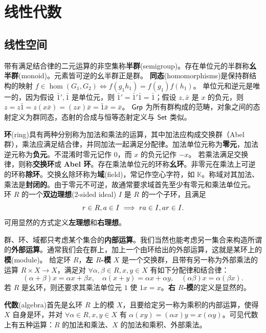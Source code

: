 \chapter{线性代数}\label{appx:LA}

\section{线性空间}\label{sec:linear-space}

带有满足结合律的二元运算的非空集称\textbf{半群}(semigroup)。存在单位元的半群称\textbf{幺半群}(monoid)。元素皆可逆的幺半群正是群。
\textbf{同态}(homomorphisms)是保持群结构的映射 $f \in \hom(G_1, G_2 ) \Leftrightarrow f (g_1 h_1 )=f (g_1 ) f (h_1 )$。
单位元和逆元是唯一的，因为假设 $\bar 1',\bar 1$ 是单位元，则 $\bar 1'=\bar 1'\bar 1=\bar 1$；假设 $z,\bar x$ 是 $x$ 的负元，则 $z=z\bar 1=z(x\bar x)=(zx)\bar x=\bar 1\bar x=\bar x$。
$\mathsf{Grp}$ 为所有群构成的范畴，对象之间的态射定义为群同态，态射的合成与恒等态射定义与 $\mathsf{Set}$ 类似。

\textbf{环}(ring)具有两种分别称为加法和乘法的运算，其中加法应构成交换群（Abel 群），乘法应满足结合律，并同加法一起满足分配律。加法单位元称为\textbf{零元}，加法逆元称为\textbf{负元}。不混淆时零元记作 $0$，而 $x$ 的负元记作 $-x$。
若乘法满足交换律，则称\textbf{交换环}或 \textbf{Abel 环}。存在乘法单位元的环称\textbf{幺环}。非零元在乘法上可逆的环称\textbf{除环}。交换幺除环称为\textbf{域}(field)，常记作空心字符，如 $\mathbb{K}$。称域对其加法、乘法是\textbf{封闭的}。由于零元不可逆，故通常要求域首先至少有零元和乘法单位元。
环 $R$ 的一个\textbf{双边理想}(2-sided ideal) $I$ 是 $R$ 的一个子环，且满足 
\[r \in R, a \in I \implies r a \in I, a r \in I.\]
可用显然的方式定义\textbf{左理想}和\textbf{右理想}。

群、环、域都只考虑某个集合的\textbf{内部运算}。我们当然也能考虑另一集合来构造所谓的\textbf{外部运算}。通常我们会在群上，加上一个由环给出的外部运算，这就是某环上的\textbf{模}(module)。
给定环 $R$，\textbf{左 $R$-模} $X$ 是一个交换群，且带有另一称为外部乘法的运算 $R \times X \rightarrow X$，满足对 $\forall \alpha,\beta \in R, x,y \in X$ 有如下分配律和结合律：
\[(\alpha+\beta) x=\alpha x+\beta x,\quad \alpha(x+y)=\alpha x+\alpha y,\quad (\alpha\beta)x=\alpha(\beta x).\]
若 $R$ 是幺环，则还要求其乘法单位元 $1$ 使 $1x=x$。\textbf{右 $R$-模}的定义是显然的。

\textbf{代数}(algebra)首先是幺环 $R$ 上的模 $X$，且要给定另一称为乘积的内部运算，使得 $X$ 自身是环，并对 $\forall \alpha \in R, x,y \in X$ 有 $\alpha(xy)=(\alpha x) y=x(\alpha y)$。可见代数上有五种运算：$R$ 的加法和乘法、$X$ 的加法和乘积、外部乘法。

